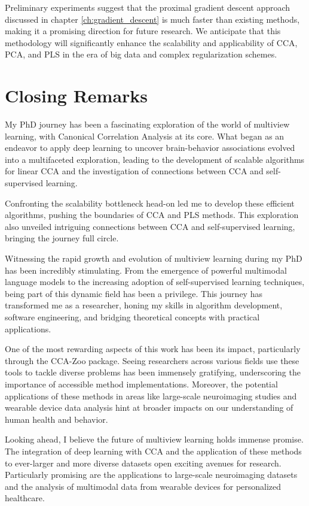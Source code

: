 Preliminary experiments suggest that the proximal gradient descent approach discussed in chapter \ref{ch:gradient_descent} is much faster than existing methods, making it a promising direction for future research. We anticipate that this methodology will significantly enhance the scalability and applicability of CCA, PCA, and PLS in the era of big data and complex regularization schemes.

\section{Closing Remarks}

My PhD journey has been a fascinating exploration of the world of multiview learning, with Canonical Correlation Analysis at its core. What began as an endeavor to apply deep learning to uncover brain-behavior associations evolved into a multifaceted exploration, leading to the development of scalable algorithms for linear CCA and the investigation of connections between CCA and self-supervised learning.

Confronting the scalability bottleneck head-on led me to develop these efficient algorithms, pushing the boundaries of CCA and PLS methods. This exploration also unveiled intriguing connections between CCA and self-supervised learning, bringing the journey full circle.

Witnessing the rapid growth and evolution of multiview learning during my PhD has been incredibly stimulating. From the emergence of powerful multimodal language models to the increasing adoption of self-supervised learning techniques, being part of this dynamic field has been a privilege. This journey has transformed me as a researcher, honing my skills in algorithm development, software engineering, and bridging theoretical concepts with practical applications.

One of the most rewarding aspects of this work has been its impact, particularly through the CCA-Zoo package. Seeing researchers across various fields use these tools to tackle diverse problems has been immensely gratifying, underscoring the importance of accessible method implementations. Moreover, the potential applications of these methods in areas like large-scale neuroimaging studies and wearable device data analysis hint at broader impacts on our understanding of human health and behavior.

Looking ahead, I believe the future of multiview learning holds immense promise. The integration of deep learning with CCA and the application of these methods to ever-larger and more diverse datasets open exciting avenues for research. Particularly promising are the applications to large-scale neuroimaging datasets and the analysis of multimodal data from wearable devices for personalized healthcare.
